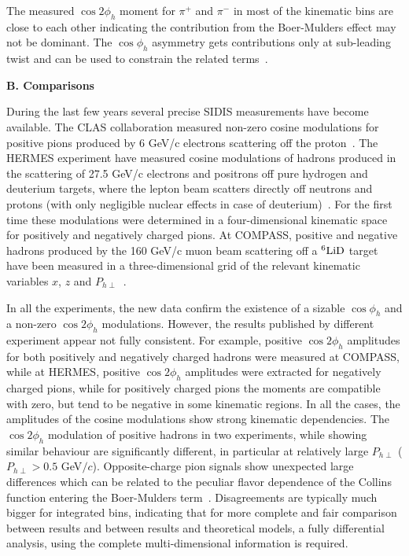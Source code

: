 \documentclass[aps,prl,twocolumn,showpacs,superscriptaddress,groupedaddress]{revtex4-1}  %
\newcommand{\Phperp}{P_{h\perp}}
\begin{document}
The measured $\cos 2 \phi_h$ moment for $\pi^+$ and $\pi^-$ in most of the kinematic bins are close to each other indicating the contribution from the Boer-Mulders effect may not be dominant.
The $\cos \phi_h$ asymmetry gets contributions only at sub-leading twist and can be used to constrain the related terms~\cite{Cahn:1978se,Anselmino:2005nn,Berger:1979xz}.

\begin{center}
\textbf{B. Comparisons} \par
\end{center}

During the last few years several precise SIDIS measurements have become available. The CLAS
collaboration measured non-zero cosine modulations for positive pions produced
by 6 GeV/c electrons scattering off the proton~\cite{Osipenko:2008rv}.  The
HERMES experiment have measured cosine modulations of hadrons produced in the
scattering of 27.5 GeV/c electrons and positrons off pure hydrogen and deuterium
targets, where the lepton beam scatters directly off neutrons and protons (with
only negligible nuclear effects in case of
deuterium)~\cite{Airapetian:2012yg}. For the first time these modulations were
determined in a four-dimensional kinematic space for positively and negatively
charged pions.
At COMPASS, positive and negative hadrons produced by the 160 GeV/c muon beam
scattering off a $\rm ^6LiD$ target have been measured in a three-dimensional
grid of the relevant kinematic variables $x$, $z$ and
$\Phperp$~\cite{Adolph:2014pwc}.

In all the experiments, the new data confirm the existence of a sizable
$\cos\phi_h$ and a non-zero $\cos2\phi_h$ modulations.  However, the results
published by different experiment appear not fully consistent. For example,
positive $\cos2\phi_h$ amplitudes for both positively and negatively charged
hadrons were measured at COMPASS, while at HERMES, positive $\cos 2\phi_h$ amplitudes
were extracted for negatively charged pions, while for positively charged pions
the moments are compatible with zero, but tend to be negative in some kinematic
regions. In all the cases, the amplitudes of the cosine modulations show strong
kinematic dependencies. 
The $\cos2\phi_h$ modulation of positive hadrons in two experiments, while showing similar behaviour are significantly different, in particular at relatively large $\Phperp$  ($\Phperp>0.5$ GeV$/c$).
Opposite-charge pion signals show unexpected large differences which can be related to the peculiar flavor dependence of the Collins function entering the Boer-Mulders term~\cite{Airapetian:2012yg}. Disagreements are typically much bigger for integrated bins, indicating that for 
more complete and fair comparison between results and between results
and theoretical models, a fully differential analysis, using the complete
multi-dimensional information is required.
\end{document}
